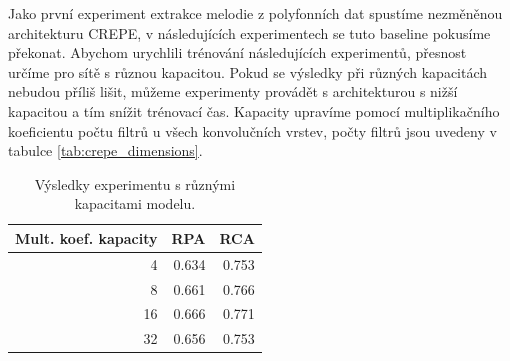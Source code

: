 Jako první experiment extrakce melodie z polyfonních dat spustíme nezměněnou architekturu CREPE, v následujících experimentech se tuto baseline pokusíme překonat. Abychom urychlili trénování následujících experimentů, přesnost určíme pro sítě s různou kapacitou. Pokud se výsledky při různých kapacitách nebudou příliš lišit, můžeme experimenty provádět s architekturou s nižší kapacitou a tím snížit trénovací čas. Kapacity upravíme pomocí multiplikačního koeficientu počtu filtrů u všech konvolučních vrstev, počty filtrů jsou uvedeny v tabulce \ref{tab:crepe_dimensions}.


\begin{table}[h!]

\centering

\begin{tabular}{rrr}
\toprule
Mult. koef. kapacity &   RPA &   RCA \\
\midrule
                   4 & 0.634 & 0.753 \\
                   8 & 0.661 & 0.766 \\
                  16 & 0.666 & 0.771 \\
                  32 & 0.656 & 0.753 \\
\bottomrule
\end{tabular}
\caption{Výsledky experimentu s různými kapacitami modelu.}\label{tab:crepe_capacity}
\end{table}

